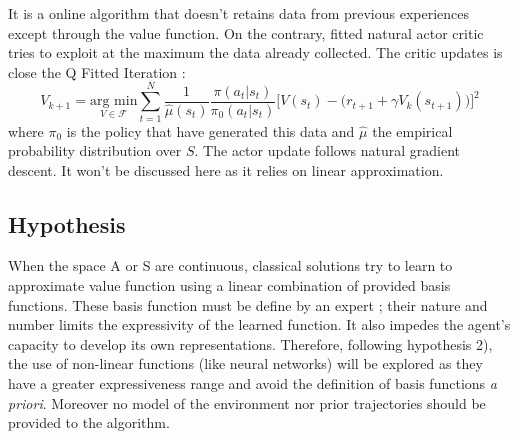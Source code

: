 It is a online algorithm that doesn't retains data from previous experiences except through the
value function. On the contrary, fitted natural actor critic \cite{Melo2008} tries to exploit 
at the maximum the data already collected. The critic updates is close the Q Fitted Iteration :
\begin{equation}
 V_{k+1} = \underset{V \in \mathcal{F}}{\text{arg min}} \sum_{t=1}^{N} 
 \frac{1}{\hat{\mu}(s_t)} 
 \frac{\pi(a_t|s_t)}{\pi_0(a_t|s_t)}  
 \Big[ V(s_t) - \big( r_{t+1} + \gamma V_k(s_{t+1}) \big) \Big]^2
\end{equation}
where $\pi_0$ is the policy that have generated this data and $\hat{\mu}$ the empirical 
probability distribution over $S$. The actor update follows natural gradient descent. It won't
be discussed here as it relies on linear approximation.

\subsection{Hypothesis}

When the space A or S are continuous, classical solutions try to learn to approximate value function 
using a linear combination of provided basis functions. 
These basis function must be define by an expert ; their nature and number limits the expressivity 
of the learned function. It also impedes the agent's capacity to develop its own representations.
Therefore, following hypothesis 2), the use of non-linear functions (like neural networks) 
will be explored as they have a greater expressiveness range and avoid the definition of basis functions
{\it a priori}. Moreover no model of the environment nor prior trajectories should be provided to the algorithm.






